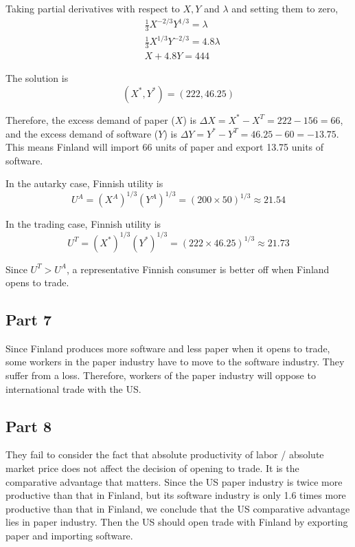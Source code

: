 \documentclass{article}
\begin{document}
Taking partial derivatives with respect to $X,Y$ and $\lambda$ and setting them to zero,
\begin{align*}
&\frac{1}{3}X^{-2/3}Y^{1/3}=\lambda\\
&\frac{1}{3}X^{1/3}Y^{-2/3}=4.8\lambda\\
&X+4.8Y=444
\end{align*}

The solution is
\begin{equation*}
(X^*,Y^*)=(222,46.25)
\end{equation*}

Therefore, the excess demand of paper ($X$) is $\Delta X=X^*-X^T=222-156=66$, and the excess demand of software ($Y$) is $\Delta Y=Y^*-Y^T=46.25-60=-13.75$. This means Finland will import 66 units of paper and export 13.75 units of software.

In the autarky case, Finnish utility is
\begin{equation*}
U^A=(X^A)^{1/3}(Y^A)^{1/3}=(200\times 50)^{1/3}\approx21.54
\end{equation*}

In the trading case, Finnish utility is
\begin{equation*}
U^T=(X^*)^{1/3}(Y^*)^{1/3}=(222\times 46.25)^{1/3}\approx21.73
\end{equation*}

Since $U^T>U^A$, a representative Finnish consumer is better off when Finland opens to trade.

\subsection{Part 7}
Since Finland produces more software and less paper when it opens to trade, some workers in the paper industry have to move to the software industry. They suffer from a loss. Therefore, workers of the paper industry will oppose to international trade with the US.

\subsection{Part 8}
They fail to consider the fact that absolute productivity of labor / absolute market price does not affect the decision of opening to trade. It is the comparative advantage that matters. Since the US paper industry is twice more productive than that in Finland, but its software industry is only 1.6 times more productive than that in Finland, we conclude that the US comparative advantage lies in paper industry. Then the US should open trade with Finland by exporting paper and importing software.
\end{document}
